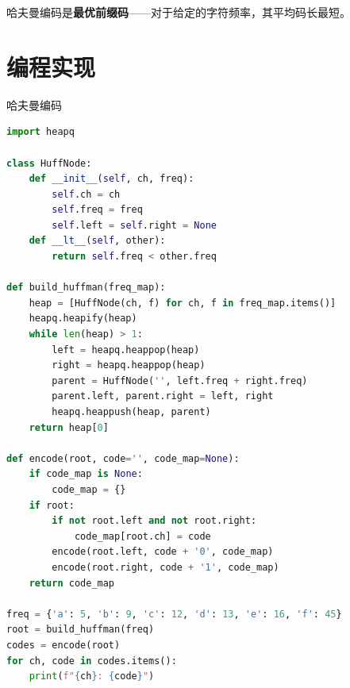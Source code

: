 哈夫曼编码是\textbf{最优前缀码}——对于给定的字符频率，其平均码长最短。

\section{编程实现}

\begin{mycode}{哈夫曼编码}
\begin{lstlisting}[language=Python]
import heapq

class HuffNode:
    def __init__(self, ch, freq):
        self.ch = ch
        self.freq = freq
        self.left = self.right = None
    def __lt__(self, other):
        return self.freq < other.freq

def build_huffman(freq_map):
    heap = [HuffNode(ch, f) for ch, f in freq_map.items()]
    heapq.heapify(heap)
    while len(heap) > 1:
        left = heapq.heappop(heap)
        right = heapq.heappop(heap)
        parent = HuffNode('', left.freq + right.freq)
        parent.left, parent.right = left, right
        heapq.heappush(heap, parent)
    return heap[0]

def encode(root, code='', code_map=None):
    if code_map is None:
        code_map = {}
    if root:
        if not root.left and not root.right:
            code_map[root.ch] = code
        encode(root.left, code + '0', code_map)
        encode(root.right, code + '1', code_map)
    return code_map

freq = {'a': 5, 'b': 9, 'c': 12, 'd': 13, 'e': 16, 'f': 45}
root = build_huffman(freq)
codes = encode(root)
for ch, code in codes.items():
    print(f"{ch}: {code}")
\end{lstlisting}
\end{mycode}

